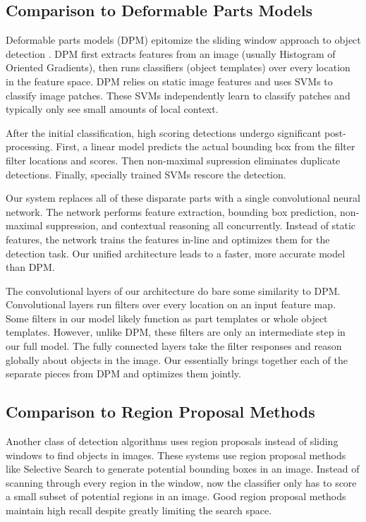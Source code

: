 \documentclass{article} %
\begin{document}
\subsection{Comparison to Deformable Parts Models}

Deformable parts models (DPM) epitomize the sliding window approach to object detection \cite{lsvm-pami}. DPM first extracts features from an image (usually Histogram of Oriented Gradients), then runs classifiers (object templates) over every location in the feature space. DPM relies on static image features and uses SVMs to classify image patches. These SVMs independently learn to classify patches and typically only see small amounts of local context.

After the initial classification, high scoring detections undergo significant post-processing. First, a linear model predicts the actual bounding box from the filter filter locations and scores. Then non-maximal supression eliminates duplicate detections. Finally, specially trained SVMs rescore the detection.

Our system replaces all of these disparate parts with a single convolutional neural network. The network performs feature extraction, bounding box prediction, non-maximal suppression, and contextual reasoning all concurrently. Instead of static features, the network trains the features in-line and optimizes them for the detection task. Our unified architecture leads to a faster, more accurate model than DPM.

The convolutional layers of our architecture do bare some similarity to DPM. Convolutional layers run filters over every location on an input feature map. Some filters in our model likely function as part templates or whole object templates. However, unlike DPM, these filters are only an intermediate step in our full model. The fully connected layers take the filter responses and reason globally about objects in the image. Our essentially brings together each of the separate pieces from DPM and optimizes them jointly.

\subsection{Comparison to Region Proposal Methods}

Another class of detection algorithms uses region proposals instead of sliding windows to find objects in images. These systems use region proposal methods like Selective Search \cite{uijlings2013selective} to generate potential bounding boxes in an image. Instead of scanning through every region in the window, now the classifier only has to score a small subset of potential regions in an image. Good region proposal methods maintain high recall despite greatly limiting the search space.
\end{document}
